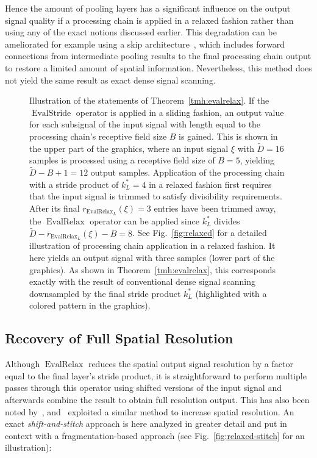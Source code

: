 \documentclass[journal]{IEEEtran}
\newcommand{\ROI}{B}
\DeclareMathOperator{\EvalStride}{EvalStride}
\DeclareMathOperator{\EvalRelax}{EvalRelax}
\begin{document}
Hence the amount of pooling layers has a significant influence on the output signal quality if a processing chain is applied in a relaxed fashion rather than using any of the exact notions discussed earlier.
This degradation can be ameliorated for example using a skip architecture~, which includes forward connections from intermediate pooling results to the final processing chain output to restore a limited amount of spatial information.
Nevertheless, this method does not yield the same result as exact dense signal scanning.

\begin{figure}[p]
  \centering
  \caption{Illustration of the statements of Theorem~\ref{tmh:evalrelax}.
    If the $\EvalStride$ operator is applied in a sliding fashion, an output value for each subsignal of the input signal with length equal to the processing chain's receptive field size $\ROI$ is gained.
    This is shown in the upper part of the graphics, where an input signal $\xi$ with $\tilde{D} = 16$ samples is processed using a receptive field size of $\ROI = 5$, yielding $\tilde{D} - \ROI + 1 = 12$ output samples.
    Application of the processing chain with a stride product of $k_L^* = 4$ in a relaxed fashion first requires that the input signal is trimmed to satisfy divisibility requirements.
    After its final $r_{\EvalRelax_L}(\xi) = 3$ entries have been trimmed away, the $\EvalRelax$ operator can be applied since $k_L^*$ divides $\tilde{D} - r_{\EvalRelax_L}(\xi) - \ROI = 8$.
    See Fig.~\ref{fig:relaxed} for a detailed illustration of processing chain application in a relaxed fashion.
    It here yields an output signal with three samples (lower part of the graphics).
    As shown in Theorem~\ref{tmh:evalrelax}, this corresponds exactly with the result of conventional dense signal scanning downsampled by the final stride product $k_L^*$ (highlighted with a colored pattern in the graphics).}
  \label{fig:relaxed-down}
\end{figure}\subsection{Recovery of Full Spatial Resolution}
Although $\EvalRelax$ reduces the spatial output signal resolution by a factor equal to the final layer's stride product, it is straightforward to perform multiple passes through this operator using shifted versions of the input signal and afterwards combine the result to obtain full resolution output.
This has also been noted by~, and~ exploited a similar method to increase spatial resolution.
An exact \emph{shift-and-stitch} approach is here analyzed in greater detail and put in context with a fragmentation-based approach (see Fig.~\ref{fig:relaxed-stitch} for an illustration):
\end{document}
